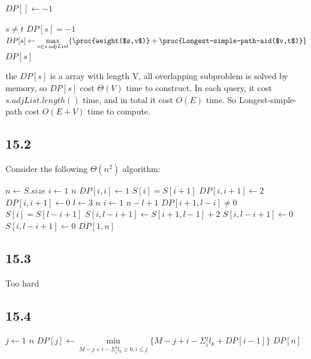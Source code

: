 \documentclass[]{article}
\begin{document}
\begin{codebox}
	\li $DP[] \leftarrow -1$
	\li \Return {}
\end{codebox}

\begin{codebox}
	\li \If $s \neq t$
	\li \Then \If $DP[s] = -1$
	\li \Then $DP[s] \leftarrow \underset {v \in s.adjList}{\max} \{ \proc{weight($s,v$)}+\proc{Longest-simple-path-aid($v,t$)}\} $
	\End
	\li \Return $DP[s]$
	\li \Else {}
	\End
\end{codebox}

the $DP[s]$ is a array with length V, all overlapping subproblem is solved by memory, so $DP[s]$ cost $\Theta(V)$ time to construct. In each query, it cost $s.adjList.length()$ time, and in total it cost $O(E)$ time. So Longest-simple-path cost $O(E+V)$ time to compute.

\subsection{15.2}

Consider the following $\Theta(n^2)$ algorithm:

\begin{codebox}
	\li $n \leftarrow S.size$
	\li \For $i \leftarrow 1$ \To $n$
	\li \Do $DP[i,i] \leftarrow 1$
	\li \If $S[i] = S[i+1]$
	\li \Then $DP[i, i+1] \leftarrow 2$
	\li \Else $DP[i, i+1] \leftarrow 0$ \End \End
	\li \For $l \leftarrow 3$ \To $n$
	\li \Do \For $i \leftarrow 1$ \To $n-l+1$
	\li \Do \If $DP[i+1, l-i] \neq 0$
	\li \Then \If $S[i] = S[l-i+1]$
	\li \Then $S[i, l-i+1] \leftarrow S[i+1, l-1] +2$
	\li \Else $S[i, l-i+1] \leftarrow 0$ \End
	\li \Else  $S[i, l-i+1] \leftarrow 0$ \End \End \End
	\li \Return $DP[1, n]$
\end{codebox}

\subsection{15.3}
Too hard

\subsection{15.4}

\begin{codebox}
	\Procname{$\proc{Printing-Neatly($l$)}$}
	\li \For $j \leftarrow 1$ \To $n$
	\li \Do $DP[j] \leftarrow  \underset{M-j+i- \Sigma_{i}^{j}l_{k} \ge 0, i \le j}{\min} \{M-j+i- \Sigma_{i}^{j}l_{k} + DP[i-1] \}$ \End
	\li \Return $DP[n]$
\end{codebox}
\end{document}
